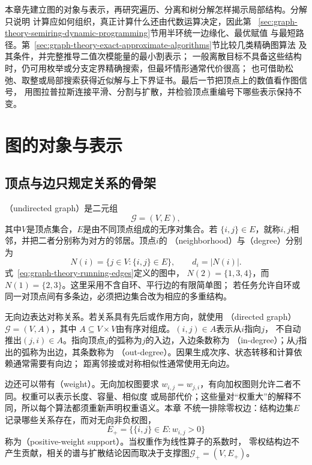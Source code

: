 本章先建立图的对象与表示，再研究遍历、分离和树分解怎样揭示局部结构。分解只说明
计算应如何组织，真正计算什么还由代数运算决定，因此第
~\ref{sec:graph-theory-semiring-dynamic-programming}节用半环统一边缘化、最优赋值
与最短路径。第~\ref{sec:graph-theory-exact-approximate-algorithms}节比较几类精确图算法
及其条件，并完整推导二值次模能量的最小割表示；
一般离散目标不具备这些结构时，仍可用枚举或分支定界精确搜索，但最坏情形通常代价很高；
也可借助松弛、取整或局部搜索获得近似解与上下界证书。最后一节把顶点上的数值看作图信号，
用图拉普拉斯连接平滑、分割与扩散，并检验顶点重编号下哪些表示保持不变。

\section{图的对象与表示}
\label{sec:graph-theory-objects-representations}

\subsection{顶点与边只规定关系的骨架}

（undirected graph）是二元组
\[
  \mathcal{G}=(V,E),
\]
其中\(V\)是顶点集合，\(E\)是由不同顶点组成的无序对集合。若
\(\{i,j\}\in E\)，就称\(i,j\)相邻，并把二者分别称为对方的邻居。顶点\(i\)的
（neighborhood）与（degree）分别为
\[
  N(i)=\{j\in V:\{i,j\}\in E\},\qquad d_i=|N(i)|.
\]
式~\eqref{eq:graph-theory-running-edges}定义的图中，
\(N(2)=\{1,3,4\}\)，而\(N(1)=\{2,3\}\)。这里采用不含自环、平行边的有限简单图；
若任务允许自环或同一对顶点间有多条边，必须把边集合改为相应的多重结构。

无向边表达对称关系。若关系具有先后或作用方向，就使用
（directed graph）\(\mathcal{G}=(V,A)\)，其中
\(A\subseteq V\times V\)由有序对组成。\((i,j)\in A\)表示从\(i\)指向\(j\)，
不自动推出\((j,i)\in A\)。指向顶点\(j\)的弧称为\(j\)的入边，入边条数称为
（in-degree）；从\(j\)指出的弧称为出边，其条数称为
（out-degree）。因果生成次序、状态转移和计算依赖通常需要有向边；
距离邻接或对称相似性通常使用无向边。

边还可以带有（weight）。无向加权图要求
\(w_{i,j}=w_{j,i}\)，有向加权图则允许二者不同。权重可以表示长度、容量、相似度
或局部代价；这些量对“权重大”的解释不同，所以每个算法都须重新声明权重语义。本章
不统一排除零权边：结构边集\(E\)记录哪些关系存在，而对无向非负权图，
\[
  E_+=\bigl\{\{i,j\}\in E:w_{i,j}>0\bigr\}
\]
称为（positive-weight support）。当权重作为线性算子的系数时，
零权结构边不产生贡献，相关的谱与扩散结论因而取决于支撑图\(\mathcal{G}_+=(V,E_+)\)。

